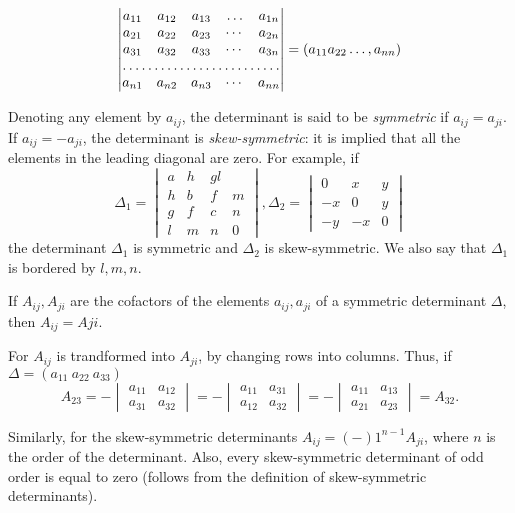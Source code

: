 $$\begin{vmatrix}a_{11} & a_{12} & a_{13} & \hdots & a_{1n}\\
  a_{21} & a_{22} & a_{23} & \cdots & a_{2n}\\
  a_{31} & a_{32} & a_{33} & \cdots & a_{3n}\\
  \hdotsfor{5}\\
  a_{n1} & a_{n2} & a_{n3} & \cdots & a_{nn}
\end{vmatrix} = (a_{11}a_{22} \ldots, a_{nn})$$

Denoting any element by $a_{ij}$, the determinant is said to be \textit{symmetric} if $a_{ij} = a_{ji}$. If $a_{ij} = -a_{ji}$, the
determinant is \textit{skew-symmetric}: it is implied that all the elements in the leading diagonal are zero. For example, if
$$\Delta_1 = \begin{vmatrix}a & h & g l\\h & b & f & m\\g & f & c & n\\l & m & n & 0\end{vmatrix},
  \Delta_2 = \begin{vmatrix}0 & x & y\\-x & 0 & y\\-y & -x & 0\end{vmatrix}$$
the determinant $\Delta_1$ is symmetric and $\Delta_2$ is skew-symmetric. We also say that $\Delta_1$ is bordered by $l, m, n$.

If $A_{ij}, A_{ji}$ are the cofactors of the elements $a_{ij}, a_{ji}$ of a symmetric determinant $\Delta$, then $A_{ij} = A{ji}$.

For $A_{ij}$ is trandformed into $A_{ji}$, by changing rows into columns. Thus, if $\Delta = (a_{11}~a_{22}~a_{33})$
$$A_{23} = -\begin{vmatrix}a_{11} & a_{12}\\a_{31} & a_{32}\end{vmatrix} = -\begin{vmatrix}a_{11} & a_{31}\\a_{12} &
a_{32}\end{vmatrix} = -\begin{vmatrix}a_{11} & a_{13}\\a_{21} & a_{23}\end{vmatrix} = A_{32}.$$

Similarly, for the skew-symmetric determinants $A_{ij} = (-)1^{n - 1}A_{ji}$, where $n$ is the order of the determinant. Also,
every skew-symmetric determinant of odd order is equal to zero (follows from the definition of skew-symmetric determinants).

